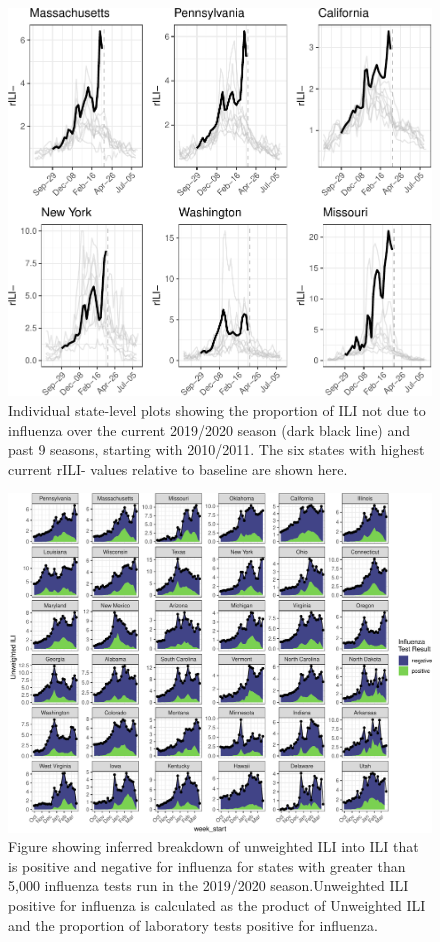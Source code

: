 \documentclass[]{article}
\begin{document}
\begin{figure}
\centering
\includegraphics{ili-labtest-report_files/figure-latex/get-sd-data-1.pdf}
\caption{Individual state-level plots showing the proportion of ILI not
due to influenza over the current 2019/2020 season (dark black line) and
past 9 seasons, starting with 2010/2011. The six states with highest
current rILI- values relative to baseline are shown here.}
\end{figure}

\begin{figure}
\centering
\includegraphics{ili-labtest-report_files/figure-latex/state-unweighted-ili-by-pos-neg-1.pdf}
\caption{Figure showing inferred breakdown of unweighted ILI into ILI
that is positive and negative for influenza for states with greater than
5,000 influenza tests run in the 2019/2020 season.Unweighted ILI
positive for influenza is calculated as the product of Unweighted ILI
and the proportion of laboratory tests positive for influenza.}
\end{figure}
\end{document}
